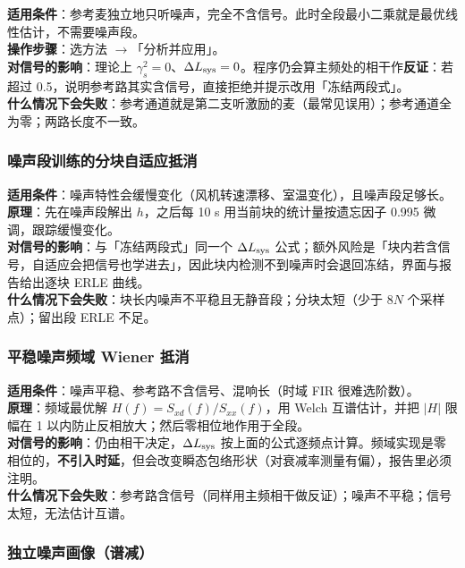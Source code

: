 \documentclass[UTF8,a4paper,12pt,scheme=chinese]{ctexart}
\begin{document}
\textbf{适用条件}：参考麦独立地只听噪声，完全不含信号。此时全段最小二乘就是最优线性估计，不需要噪声段。\\
\textbf{操作步骤}：选方法 $\rightarrow$「分析并应用」。\\
\textbf{对信号的影响}：理论上 $\gamma_s^2=0$、$\Delta L_{\rm sys}=0$。程序仍会算主频处的相干作\textbf{反证}：若超过 0.5，说明参考路其实含信号，直接拒绝并提示改用「冻结两段式」。\\
\textbf{什么情况下会失败}：参考通道就是第二支听激励的麦（最常见误用）；参考通道全为零；两路长度不一致。

\subsubsection{噪声段训练的分块自适应抵消}

\textbf{适用条件}：噪声特性会缓慢变化（风机转速漂移、室温变化），且噪声段足够长。\\
\textbf{原理}：先在噪声段解出 $h$，之后每 10 s 用当前块的统计量按遗忘因子 0.995 微调，跟踪缓慢变化。\\
\textbf{对信号的影响}：与「冻结两段式」同一个 $\Delta L_{\rm sys}$ 公式；额外风险是「块内若含信号，自适应会把信号也学进去」，因此块内检测不到噪声时会退回冻结，界面与报告给出逐块 ERLE 曲线。\\
\textbf{什么情况下会失败}：块长内噪声不平稳且无静音段；分块太短（少于 $8N$ 个采样点）；留出段 ERLE 不足。

\subsubsection{平稳噪声频域 Wiener 抵消}

\textbf{适用条件}：噪声平稳、参考路不含信号、混响长（时域 FIR 很难选阶数）。\\
\textbf{原理}：频域最优解 $H(f)=S_{xd}(f)/S_{xx}(f)$，用 Welch 互谱估计，并把 $|H|$ 限幅在 1 以内防止反相放大；然后零相位地作用于全段。\\
\textbf{对信号的影响}：仍由相干决定，$\Delta L_{\rm sys}$ 按上面的公式逐频点计算。频域实现是零相位的，\textbf{不引入时延}，但会改变瞬态包络形状（对衰减率测量有偏），报告里必须注明。\\
\textbf{什么情况下会失败}：参考路含信号（同样用主频相干做反证）；噪声不平稳；信号太短，无法估计互谱。

\subsubsection{独立噪声画像（谱减）}
\end{document}
